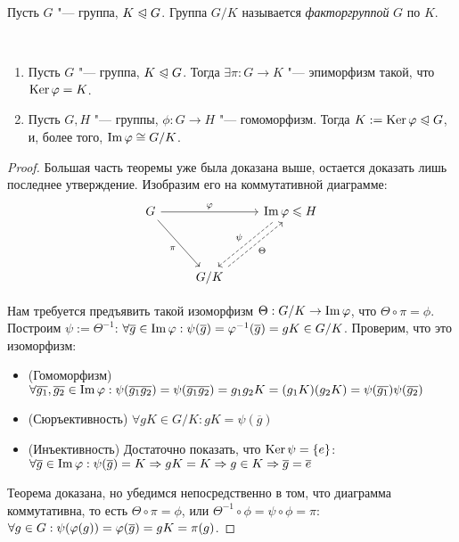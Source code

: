\begin{definition}
	Пусть $G$ "--- группа, $K \trianglelefteqslant G$. Группа $G / K$ называется \textit{факторгруппой} $G$ по $K$.
\end{definition}

\begin{theorem}~
	\begin{enumerate}
		\item Пусть $G$ "--- группа, $K \trianglelefteqslant G$. Тогда $\exists \pi: G \to K$ "--- эпиморфизм такой, что $\ke\phi \hm= K$.
		\item Пусть $G, H$ "--- группы, $\phi: G \to H$ "--- гомоморфизм. Тогда $K \hm{:=} \ke\phi \normal G$, и, более того, $\operatorname{Im}\varphi \cong G / K$.
	\end{enumerate}
\end{theorem}

\begin{proof}
	Большая часть теоремы уже была доказана выше, остается доказать лишь последнее утверждение. Изобразим его на коммутативной диаграмме:
	\[
	\begin{tikzcd}[row sep = huge]
		G \arrow{rr}{\phi} \arrow[swap]{dr}{\pi} && \im\phi \le H \arrow[dashrightarrow, swap, xshift = -4pt]{dl}{\psi}\\
		& G / K \arrow[dashrightarrow, swap, xshift = 4pt]{ur}{\Theta} &
	\end{tikzcd}
	\]
	
	Нам требуется предъявить такой изоморфизм $\Theta: G / K \to \operatorname{Im}\varphi$, что $\Theta \circ \pi = \phi$. Построим $\psi := \Theta^{-1}$: $\forall \overline{g} \in \im\phi: \psi(\overline{g}) = \phi^{-1}(\overline{g}) \hm= gK \in G / K$. Проверим, что это изоморфизм:
	\begin{itemize}
		\item (Гомоморфизм) $\forall \overline{g_1}, \overline{g_2} \in \im\phi: \psi(\overline{g_1}\overline{g_2}) = \psi(\overline{g_1g_2}) = g_1g_2K \hm= (g_1K)(g_2K) = \psi(\overline{g_1})\psi(\overline{g_2})$
		\item (Сюръективность) $\forall gK \in G / K: gK = \psi(\overline{g})$
		\item (Инъективность) Достаточно показать, что $\operatorname{Ker}\psi = \{e\}$: $\forall \overline{g} \hm\in \im\phi: \psi(\overline{g}) = K \hm\Rightarrow gK = K \Rightarrow g \in K \Rightarrow \overline{g} = \overline{e}$
	\end{itemize}
	
	Теорема доказана, но убедимся непосредственно в том, что диаграмма коммутативна, то есть $\Theta \circ \pi = \phi$, или $\Theta^{-1} \circ \phi = \psi \circ \phi = \pi$: $\forall g \hm\in G: \psi(\phi(g)) = \phi(\overline{g}) = gK = \pi(g)$.
\end{proof}

